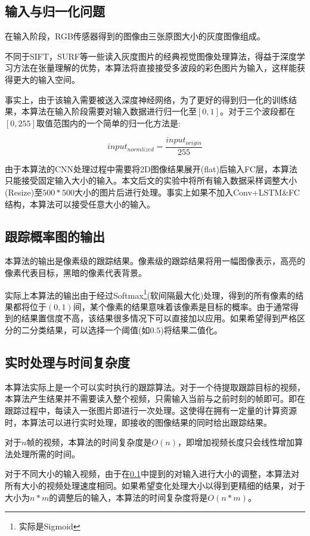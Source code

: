 \subsection{输入与归一化问题} \label{section:input_of_our_algorithm}
\par
在输入阶段，RGB传感器得到的图像由三张原图大小的灰度图像组成。
\par
不同于SIFT\supercite{lowe1999object}，SURF\supercite{bay2006surf}等一些读入灰度图片的经典视觉图像处理算法，得益于深度学习方法在张量理解的优势，本算法将直接接受多波段的彩色图片为输入，这样能获得更大的输入空间。
\par
事实上，由于该输入需要被送入深度神经网络，为了更好的得到归一化的训练结果，本算法在输入阶段需要对输入数据进行归一化至$[0,1]$。对于三个波段都在$[0,255]$取值范围内的一个简单的归一化方法是:
\par
\begin{equation}\label{equ:input_norm}  input_{normlized} = \frac{input_{origin}}{255}  \end{equation}
\par
由于本算法的CNN处理过程中需要将2D图像结果展开(flat)后输入FC层，本算法只能接受固定输入大小的输入。本文后文的实验中将所有输入数据采样调整大小(Resize)至$500*500$大小的图片后进行处理。事实上如果不加入Conv+LSTM\&FC结构，本算法可以接受任意大小的输入。
\par

\subsection{跟踪概率图的输出}
本算法的输出是像素级的跟踪结果。像素级的跟踪结果将用一幅图像表示，高亮的像素代表目标，黑暗的像素代表背景。
\par
实际上本算法的输出由于经过Softmax\footnote{实际是Sigmoid}(软间隔最大化)处理，得到的所有像素的结果都将位于$(0,1)$间，某个像素的结果意味着该像素是目标的概率。由于通常得到的结果置信度不高，该结果很多情况下可以直接加以应用。如果希望得到严格区分的二分类结果，可以选择一个阈值(如$0.5$)将结果二值化。

\subsection{实时处理与时间复杂度}
本算法实际上是一个可以实时执行的跟踪算法。对于一个待提取跟踪目标的视频，本算法产生结果并不需要读入整个视频，只需输入当前与之前时刻的帧即可。即在跟踪过程中，每读入一张图片即进行一次处理。这使得在拥有一定量的计算资源时，本算法可以进行实时处理，即接收的图像结果的同时给出跟踪结果。
\par
对于$n$帧的视频，本算法的时间复杂度是$O(n)$，即增加视频长度只会线性增加算法处理所需的时间。
\par
对于不同大小的输入视频，由于在\ref{section:input_of_our_algorithm}中提到的对输入进行大小的调整，本算法对所有大小的视频处理速度相同。如果希望变化处理大小以得到更精细的结果，对于大小为$n*m$的调整后的输入，本算法的时间复杂度将是$O(n*m)$。


